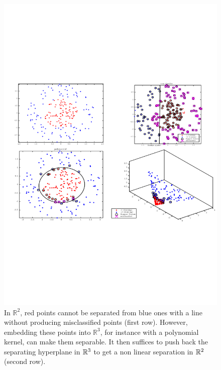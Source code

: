 \begin{figure}[h]\centering  
\includegraphics[width = 15cm]{figures/KernelTrick} \caption[Kernel trick]{\label{fig:trick} 
In $\mathbb{R}^{2}$, red points
cannot be separated from blue ones with a line without producing misclassified points (first row). However, embedding these points 
into $\mathbb{R}^{3}$, for instance with a polynomial kernel, can make them separable. It then suffices to push back the separating hyperplane in $\mathbb{R}^3$
to get a non linear separation in $\mathbb{R}^2$ (second row).   
} 
\end{figure} 


